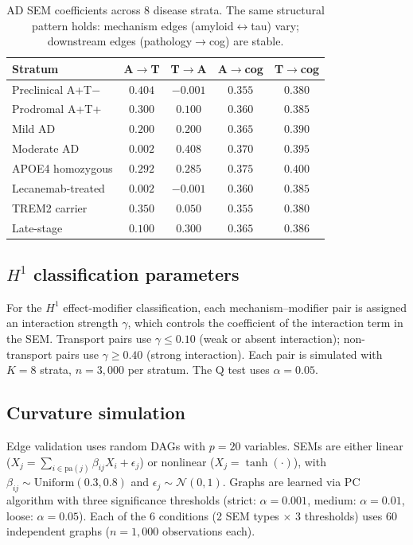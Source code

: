 \documentclass{article}
\begin{document}
\begin{table}[h]
\centering
\caption{AD SEM coefficients across 8 disease strata. The same structural pattern holds: mechanism edges (amyloid$\leftrightarrow$tau) vary; downstream edges (pathology$\to$cog) are stable.}
\label{tab:ad-sem}
\small
\begin{tabular}{@{}lcccc@{}}
\toprule
\textbf{Stratum} & \textbf{A$\to$T} & \textbf{T$\to$A} & \textbf{A$\to$cog} & \textbf{T$\to$cog} \\
\midrule
Preclinical A+T$-$ & $0.404$ & $-0.001$ & $0.355$ & $0.380$ \\
Prodromal A+T+ & $0.300$ & $0.100$ & $0.360$ & $0.385$ \\
Mild AD & $0.200$ & $0.200$ & $0.365$ & $0.390$ \\
Moderate AD & $0.002$ & $0.408$ & $0.370$ & $0.395$ \\
APOE4 homozygous & $0.292$ & $0.285$ & $0.375$ & $0.400$ \\
Lecanemab-treated & $0.002$ & $-0.001$ & $0.360$ & $0.385$ \\
TREM2 carrier & $0.350$ & $0.050$ & $0.355$ & $0.380$ \\
Late-stage & $0.100$ & $0.300$ & $0.365$ & $0.386$ \\
\bottomrule
\end{tabular}
\end{table}

\subsection{$H^1$ classification parameters}

For the $H^1$ effect-modifier classification, each mechanism--modifier pair is assigned an interaction strength $\gamma$, which controls the coefficient of the interaction term in the SEM. Transport pairs use $\gamma \leq 0.10$ (weak or absent interaction); non-transport pairs use $\gamma \geq 0.40$ (strong interaction). Each pair is simulated with $K = 8$ strata, $n = 3{,}000$ per stratum. The Q test uses $\alpha = 0.05$.

\subsection{Curvature simulation}

Edge validation uses random DAGs with $p = 20$ variables. SEMs are either linear ($X_j = \sum_{i \in \mathrm{pa}(j)} \beta_{ij} X_i + \epsilon_j$) or nonlinear ($X_j = \tanh(\cdot)$), with $\beta_{ij} \sim \mathrm{Uniform}(0.3, 0.8)$ and $\epsilon_j \sim \mathcal{N}(0, 1)$. Graphs are learned via PC algorithm with three significance thresholds (strict: $\alpha = 0.001$, medium: $\alpha = 0.01$, loose: $\alpha = 0.05$). Each of the 6 conditions (2 SEM types $\times$ 3 thresholds) uses 60 independent graphs ($n = 1{,}000$ observations each).
\end{document}
